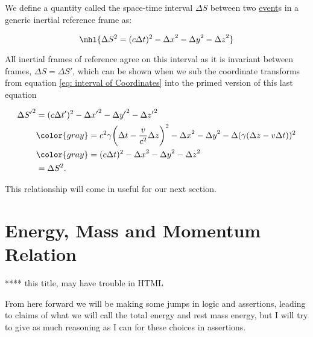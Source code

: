 We define a quantity called the space-time interval $\Delta S$ between two \hyperlink{def-event}{event}s in a generic inertial reference frame as:

\begin{equation}
	\mhl{
	\Delta S^2 = (c\Delta t)^2-{\Delta x}^2-{\Delta y}^2-{\Delta z}^2
	}
	\label{eq: space-time interval}
\end{equation}

All inertial frames of reference agree on this interval as it is invariant between frames, $\Delta S = \Delta S{'}$, which can be shown when we sub the coordinate transforms from equation \eqref{eq: interval of Coordinates} into the primed version of this last equation

\begin{equation}
	\begin{aligned}
		\Delta S{'}^2 & = (c{\Delta t{'}})^2-\Delta x{'}^2-{\Delta y{'}}^2-{\Delta z{'}}^2                                                                                          \\
		              & \color{gray} = {c}^2{\gamma} \bigg( \Delta t-\frac{v}{{c}^2} {\Delta z} \bigg)^2-{\Delta x}^2-{\Delta y}^2-\Delta ({\gamma} ( {\Delta z}- {v} \Delta t) )^2 \\
		              & \color{gray} = (c\Delta t)^2-{\Delta x}^2-{\Delta y}^2-{\Delta z}^2                                                                                         \\
		              & = \Delta S^2.
	\end{aligned}
\end{equation}

This relationship will come in useful for our next section.

\section{Energy, Mass and Momentum Relation} \label{sect: Energy, Mass and Momentum Relation}

**** this title, may have trouble in HTML

From here forward we will be making some jumps in logic and assertions, leading to claims of what we will call the total energy and rest mass energy, but I will try to give as much reasoning as I can for these choices in assertions.

